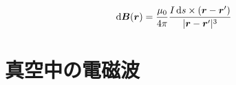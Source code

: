\documentclass[uplatex,dvipdfmx,a4paper,11pt]{jlreq}
\newcommand{\BB}{\bm{B}}
\newcommand{\rr}{\bm{r}}
\numberwithin{equation}{section}
\theoremstyle{definition}
\begin{document}
\begin{theorem}[電気四重極子]

\end{theorem}

\begin{theorem}[ビオ・サバールの法則]
  \begin{align}
    \dl{\BB}(\rr) & = \frac{\mu_0}{4\pi}\frac{I\dl{s}\times(\rr - \rr')}{|\rr - \rr'|^3}
  \end{align}
\end{theorem}

\begin{proposition}[ソレノイド]
\end{proposition}



\section{真空中の電磁波}
\end{document}
